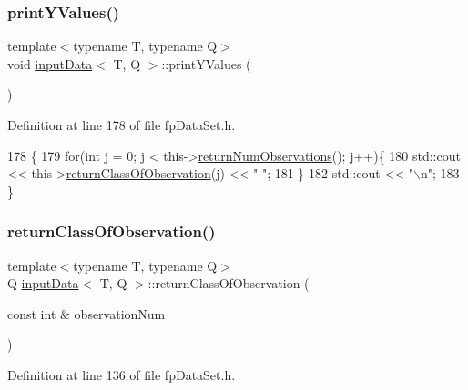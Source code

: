 \subsubsection{\texorpdfstring{print\+Y\+Values()}{printYValues()}}
{\footnotesize\ttfamily template$<$typename T, typename Q$>$ \\
void \hyperlink{classinputData}{input\+Data}$<$ T, Q $>$\+::print\+Y\+Values (\begin{DoxyParamCaption}{ }\end{DoxyParamCaption})\hspace{0.3cm}{\ttfamily [inline]}}



Definition at line 178 of file fp\+Data\+Set.\+h.


\begin{DoxyCode}
178                            \{
179             \textcolor{keywordflow}{for}(\textcolor{keywordtype}{int} j = 0; j < this->\hyperlink{classinputData_af2ac0a8c7e0bfcdf1de1ea521eadc7af}{returnNumObservations}(); j++)\{
180                 std::cout << this->\hyperlink{classinputData_ab6ba59207888898f9c008578dd59cf46}{returnClassOfObservation}(j) << \textcolor{stringliteral}{" "};
181             \}
182             std::cout << \textcolor{stringliteral}{"\(\backslash\)n"};
183         \}
\end{DoxyCode}
\mbox{\label{classinputData_ab6ba59207888898f9c008578dd59cf46}} 
\subsubsection{\texorpdfstring{return\+Class\+Of\+Observation()}{returnClassOfObservation()}}
{\footnotesize\ttfamily template$<$typename T, typename Q$>$ \\
Q \hyperlink{classinputData}{input\+Data}$<$ T, Q $>$\+::return\+Class\+Of\+Observation (\begin{DoxyParamCaption}\item[{const int \&}]{observation\+Num }\end{DoxyParamCaption})\hspace{0.3cm}{\ttfamily [inline]}}



Definition at line 136 of file fp\+Data\+Set.\+h.


